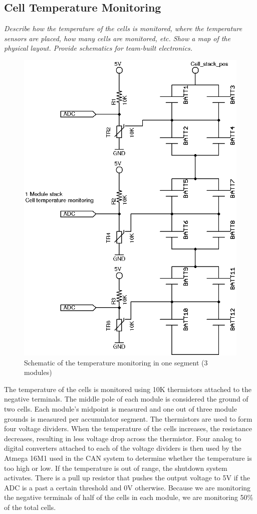 \documentclass{article}
\begin{document}
\subsection{Cell Temperature Monitoring} \label{celltopsection}

    \textit{Describe how the temperature of the cells is monitored, where the temperature sensors are placed, how many cells are monitored, etc. Show a map of the physical layout. Provide schematics for team-built electronics.}


        \begin{figure}[H]
            \centering
            \includegraphics[width = 0.4 \textwidth]{celltemp}
            \caption{Schematic of the temperature monitoring in one segment (3 modules)}
            \label{celltemp}
        \end{figure}


     The temperature of the cells is monitored using 10K thermistors attached to the negative terminals. The middle pole of each module is considered the ground of two cells. Each module's midpoint is measured and one out of three module grounds is measured per accumulator segment. The thermistors are used to form four voltage dividers. When the temperature of the cells increases, the resistance decreases, resulting in less voltage drop across the thermistor. Four analog to digital converters attached to each of the voltage dividers is then used by the Atmega 16M1 used in the CAN system to determine whether the temperature is too high or low. If the temperature is out of range, the shutdown system activates. There is a pull up resistor that pushes the output voltage to 5V if the ADC is a past a certain threshold and 0V otherwise. Because we are monitoring the negative terminals of half of the cells in each module, we are monitoring 50\% of the total cells.
\end{document}
